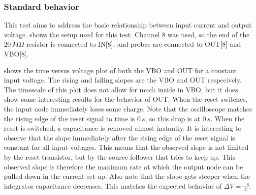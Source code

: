 \subsubsection{Standard behavior}\label{sssec:standard_behavior}
This test aims to address the basic relationship between input current and output voltage.  shows the setup used for this test. Channel 8 was used, so the end of the $20\,M\Omega$ resistor is connected to IN[8], and probes are connected to OUT[8] and VBO[8]. 



 shows the time versus voltage plot of both the VBO and OUT for a constant input voltage. The rising and falling slopes are the VBO and OUT respecively. The timescale of this plot does not allow for much inside in VBO, but it does show some interesting results for the behavior of OUT. When the reset switches, the input node immediately loses some charge. Note that the oscilloscope matches the rising edge of the reset signal to time is $0\,s$, so this drop is at $0\,s$. When the reset is switched, a capacitance is removed almost instantly. It is interesting to observe that the slope immediately after the rising edge of the reset signal is constant for all input voltages. This means that the observed slope is not limited by the reset transistor, but by the source follower that tries to keep up. This observed slope is therefore the maximum rate at which the output node can be pulled down in the current set-up. Also note that the slope gets steeper when the integrator capacitance decreases. This matches the expected behavior of $\Delta V = \frac{-q}{C}$.


